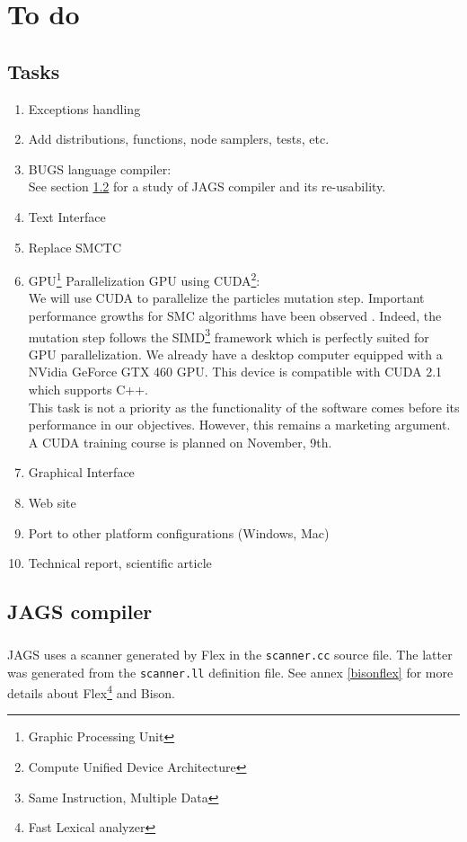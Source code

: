 \chapter{To do}
\label{todo}

\section{Tasks}


\begin{enumerate}
 \item Exceptions handling
 \item Add distributions, functions, node samplers, tests, etc.
 \item BUGS language compiler: \\
  See section \ref{jags_compiler} for a study of JAGS compiler and its re-usability.
 \item Text Interface
 \item Replace SMCTC
 \item GPU\footnote{Graphic Processing Unit} Parallelization GPU using CUDA\footnote{Compute Unified Device Architecture}: \\
We will use CUDA to parallelize the particles mutation step. Important performance growths for SMC algorithms have been observed \cite{lee_utility_2009}. Indeed, the mutation step follows the SIMD\footnote{Same Instruction, Multiple Data} framework which is perfectly suited for GPU parallelization. We already have a desktop computer equipped with a NVidia GeForce GTX 460 GPU. This device is compatible with CUDA 2.1 which supports C++.\\
This task is not a priority as the functionality of the software comes before its performance in our objectives. However, this remains a marketing argument. A CUDA training course is planned on November, 9th.
 \item Graphical Interface
 \item Web site
 \item Port to other platform configurations (Windows, Mac)
 \item Technical report, scientific article
\end{enumerate}


\section{JAGS compiler}
\label{jags_compiler}

\paragraph{}
JAGS uses a scanner generated by Flex in the \texttt{scanner.cc} source file. The latter was generated from the \texttt{scanner.ll} definition file. See annex \ref{bisonflex} for more details about Flex\footnote{Fast Lexical analyzer} and Bison.

